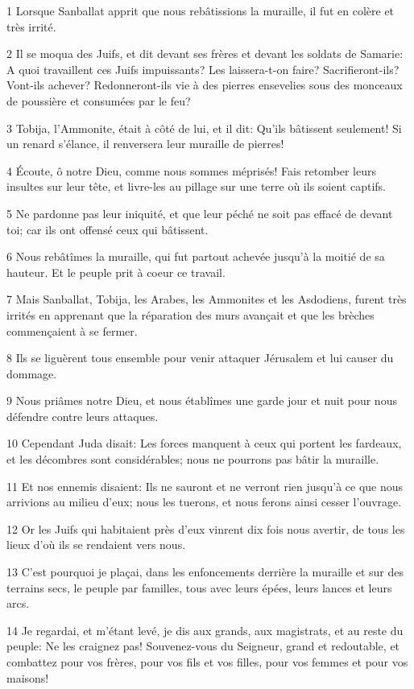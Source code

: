 \par 1 Lorsque Sanballat apprit que nous rebâtissions la muraille, il fut en colère et très irrité.
\par 2 Il se moqua des Juifs, et dit devant ses frères et devant les soldats de Samarie: A quoi travaillent ces Juifs impuissants? Les laissera-t-on faire? Sacrifieront-ils? Vont-ils achever? Redonneront-ils vie à des pierres ensevelies sous des monceaux de poussière et consumées par le feu?
\par 3 Tobija, l'Ammonite, était à côté de lui, et il dit: Qu'ils bâtissent seulement! Si un renard s'élance, il renversera leur muraille de pierres!
\par 4 Écoute, ô notre Dieu, comme nous sommes méprisés! Fais retomber leurs insultes sur leur tête, et livre-les au pillage sur une terre où ils soient captifs.
\par 5 Ne pardonne pas leur iniquité, et que leur péché ne soit pas effacé de devant toi; car ils ont offensé ceux qui bâtissent.
\par 6 Nous rebâtîmes la muraille, qui fut partout achevée jusqu'à la moitié de sa hauteur. Et le peuple prit à coeur ce travail.
\par 7 Mais Sanballat, Tobija, les Arabes, les Ammonites et les Asdodiens, furent très irrités en apprenant que la réparation des murs avançait et que les brèches commençaient à se fermer.
\par 8 Ils se liguèrent tous ensemble pour venir attaquer Jérusalem et lui causer du dommage.
\par 9 Nous priâmes notre Dieu, et nous établîmes une garde jour et nuit pour nous défendre contre leurs attaques.
\par 10 Cependant Juda disait: Les forces manquent à ceux qui portent les fardeaux, et les décombres sont considérables; nous ne pourrons pas bâtir la muraille.
\par 11 Et nos ennemis disaient: Ils ne sauront et ne verront rien jusqu'à ce que nous arrivions au milieu d'eux; nous les tuerons, et nous ferons ainsi cesser l'ouvrage.
\par 12 Or les Juifs qui habitaient près d'eux vinrent dix fois nous avertir, de tous les lieux d'où ils se rendaient vers nous.
\par 13 C'est pourquoi je plaçai, dans les enfoncements derrière la muraille et sur des terrains secs, le peuple par familles, tous avec leurs épées, leurs lances et leurs arcs.
\par 14 Je regardai, et m'étant levé, je dis aux grands, aux magistrats, et au reste du peuple: Ne les craignez pas! Souvenez-vous du Seigneur, grand et redoutable, et combattez pour vos frères, pour vos fils et vos filles, pour vos femmes et pour vos maisons!
